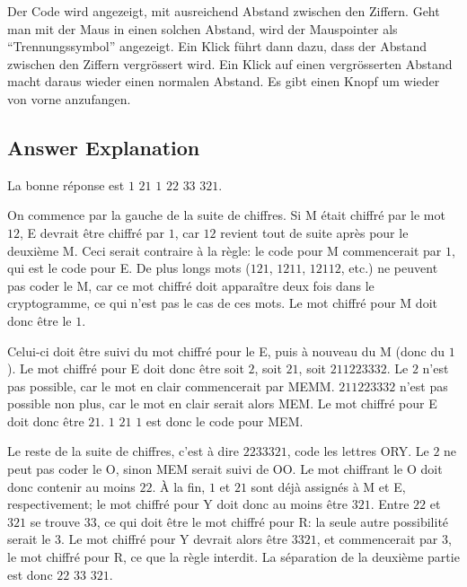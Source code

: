 \documentclass[a4paper,11pt]{report}
\newcommand{\BrochureInlineCode}[1]{{\ttfamily #1}}
\begin{document}
Der Code wird angezeigt, mit ausreichend Abstand zwischen den Ziffern.  Geht man mit der Maus in einen solchen Abstand, wird der Mauspointer als “Trennungssymbol” angezeigt.  Ein Klick führt dann dazu, dass der Abstand zwischen den Ziffern vergrössert wird.  Ein Klick auf einen vergrösserten Abstand macht daraus wieder einen normalen Abstand. Es gibt einen Knopf um wieder von vorne anzufangen.

\endgroup

\subsection*{Answer Explanation}

La bonne réponse est $1$ $21$ $1$ $22$ $33$ $321$.

On commence par la gauche de la suite de chiffres. Si \BrochureInlineCode{M} était chiffré par le mot $12$, \BrochureInlineCode{E} devrait être chiffré par $1$, car $12$ revient tout de suite après pour le deuxième \BrochureInlineCode{M}. Ceci serait contraire à la règle: le code pour \BrochureInlineCode{M} commencerait par $1$, qui est le code pour \BrochureInlineCode{E}. De plus longs mots ($121$, $1211$, $12112$, etc.) ne peuvent pas coder le \BrochureInlineCode{M}, car ce mot chiffré doit apparaître deux fois dans le cryptogramme, ce qui n’est pas le cas de ces mots. Le mot chiffré pour \BrochureInlineCode{M} doit donc être le $1$.

Celui-ci doit être suivi du mot chiffré pour le \BrochureInlineCode{E}, puis à nouveau du \BrochureInlineCode{M} (donc du $1$). Le mot chiffré pour \BrochureInlineCode{E} doit donc être soit $2$, soit $21$, soit $211223332$. Le $2$ n’est pas possible, car le mot en clair commencerait par \BrochureInlineCode{MEMM}. $211223332$ n’est pas possible non plus, car le mot en clair serait alors \BrochureInlineCode{MEM}. Le mot chiffré pour \BrochureInlineCode{E} doit donc être $21$. $1$ $21$ $1$ est donc le code pour \BrochureInlineCode{MEM}.

Le reste de la suite de chiffres, c’est à dire $2233321$, code les lettres \BrochureInlineCode{ORY}. Le $2$ ne peut pas coder le \BrochureInlineCode{O}, sinon \BrochureInlineCode{MEM} serait suivi de \BrochureInlineCode{OO}. Le mot chiffrant le \BrochureInlineCode{O} doit donc contenir au moins $22$. À la fin, $1$ et $21$ sont déjà assignés à \BrochureInlineCode{M} et \BrochureInlineCode{E}, respectivement; le mot chiffré pour \BrochureInlineCode{Y} doit donc au moins être $321$. Entre $22$ et $321$ se trouve $33$, ce qui doit être le mot chiffré pour \BrochureInlineCode{R}: la seule autre possibilité serait le $3$. Le mot chiffré pour \BrochureInlineCode{Y} devrait alors être $3321$, et commencerait par $3$, le mot chiffré pour \BrochureInlineCode{R}, ce que la règle interdit. La séparation de la deuxième partie est donc $22$ $33$ $321$.
\end{document}
